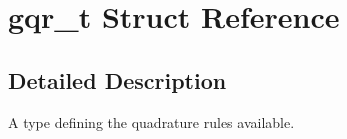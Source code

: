 \section{gqr\_\-t Struct Reference}
\label{structgqr__t}


\subsection{Detailed Description}
A type defining the quadrature rules available. 

